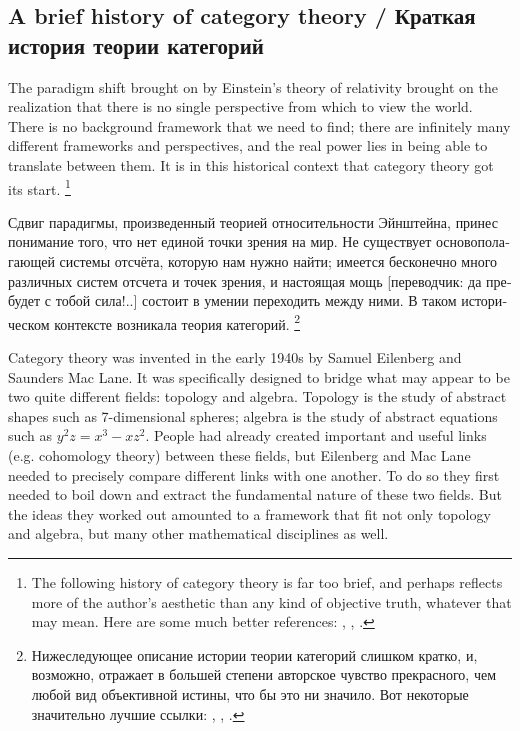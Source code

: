 \documentclass{book}
\theoremstyle{theoremENG}
\theoremstyle{lemmaENG}
\theoremstyle{propositionENG}
\theoremstyle{corollaryENG}
\theoremstyle{factENG}
\theoremstyle{remarkENG}
\theoremstyle{exampleENG}
\theoremstyle{warningENG}
\theoremstyle{questionENG}
\theoremstyle{guessENG}
\theoremstyle{answerENG}
\theoremstyle{constructionENG}
\theoremstyle{rulesENG}
\theoremstyle{excENG}
\theoremstyle{appENG}
\theoremstyle{definitionENG}
\theoremstyle{notationENG}
\theoremstyle{conjectureENG}
\theoremstyle{postulateENG}
\theoremstyle{theoremRUS}
\theoremstyle{lemmaRUS}
\theoremstyle{propositionRUS}
\theoremstyle{corollaryRUS}
\theoremstyle{factRUS}
\theoremstyle{remarkRUS}
\theoremstyle{exampleRUS}
\theoremstyle{warningRUS}
\theoremstyle{questionRUS}
\theoremstyle{guessRUS}
\theoremstyle{answerRUS}
\theoremstyle{constructionRUS}
\theoremstyle{rulesRUS}
\theoremstyle{excRUS}
\theoremstyle{appRUS}
\theoremstyle{definitionRUS}
\theoremstyle{notationRUS}
\theoremstyle{conjectureRUS}
\theoremstyle{postulateRUS}
\begin{document}
\begin{english}

\section{A brief history of category theory /  Краткая история теории категорий }

The paradigm shift brought on by Einstein's theory of relativity brought on the realization that there is no single perspective from which to view the world. There is no background framework that we need to find; there are infinitely many different frameworks and perspectives, and the real power lies in being able to translate between them. It is in this historical context that category theory got its start.
\footnote{The following history of category theory is far too brief, and perhaps reflects more of the author's aesthetic than any kind of objective truth, whatever that may mean. Here are some much better references: \cite{Kro}, \cite{Mar1}, \cite{LM}.}

\begin{russian}
Сдвиг парадигмы, произведенный теорией относительности Эйнштейна, принес понимание того, что нет единой точки зрения на мир. Не существует основополагающей системы отсчёта, которую нам нужно найти; имеется бесконечно много различных систем отсчета и точек зрения, и настоящая мощь [переводчик: да пребудет с тобой сила!..] состоит в умении переходить между ними. В таком историческом контексте возникала теория категорий.
\footnote{Нижеследующее описание истории теории категорий слишком кратко, и, возможно, отражает в большей степени авторское чувство прекрасного, чем любой вид объективной истины, что бы это ни значило. Вот некоторые значительно лучшие ссылки: \cite{Kro}, \cite{Mar1}, \cite{LM}.}
 \end{russian}

Category theory was invented in the early 1940s by Samuel Eilenberg and Saunders Mac Lane. It was specifically designed to bridge what may appear to be two quite different fields: topology and algebra. Topology is the study of abstract shapes such as 7-dimensional spheres; algebra is the study of abstract equations such as $y^2z=x^3-xz^2$. People had already created important and useful links (e.g. cohomology theory) between these fields, but Eilenberg and Mac Lane needed to precisely compare different links with one another. To do so they first needed to boil down and extract the fundamental nature of these two fields. But the ideas they worked out amounted to a framework that fit not only topology and algebra, but many other mathematical disciplines as well.


\end{english}
\end{document}
